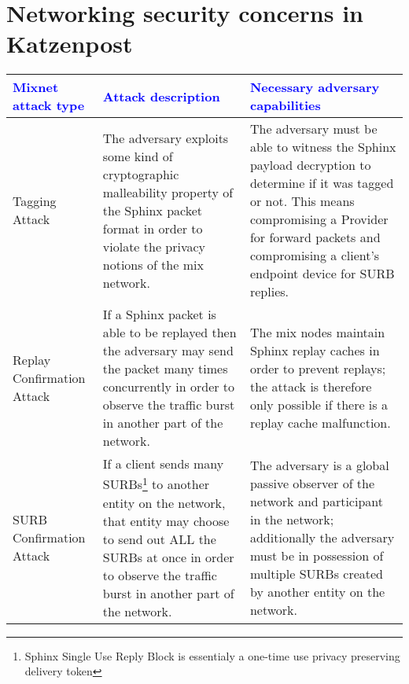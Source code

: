 \documentclass{article}
\begin{document}
\normalsize

\section{Networking security concerns in Katzenpost}
\begin{center}
\selectfont
\begin{tabularx}{\textwidth}[t]{|m{}| m{}| m{}| }
\arrayrulecolor{blue}\hline 
\rowcolor{lightBlue} 
\textbf{\textcolor{blue}{Mixnet \linebreak attack type}} & \textbf{\textcolor{blue}{Attack description}} & \textbf{\textcolor{blue}{Necessary adversary capabilities}} \\

\hline Tagging Attack & The adversary exploits some kind of cryptographic malleability property of the Sphinx packet format in order to violate the privacy notions of the mix network. 
& The adversary must be able to witness the Sphinx payload decryption to determine if it was tagged or not. This means compromising a Provider for forward packets and compromising a client's endpoint device for SURB replies.\\

\hline Replay Confirmation Attack & If a Sphinx packet is able to be replayed then the adversary may send the packet many times concurrently in order to observe the traffic burst in another part of the network.  & The mix nodes maintain Sphinx replay caches in order to prevent replays; the attack is therefore only possible if there is a replay cache malfunction. \\

\hline SURB Confirmation Attack & If a client sends many SURBs\footnote{Sphinx Single Use Reply Block is essentialy a one-time use privacy preserving delivery token} to another entity on the network, that entity may choose to send out ALL the SURBs at once in order to observe the traffic burst in another part of the network. & The adversary is a global passive observer of the network and participant in the network; additionally the adversary must be in possession of multiple SURBs created by another entity on the network. \\


\end{tabularx}
\end{center}
\end{document}
